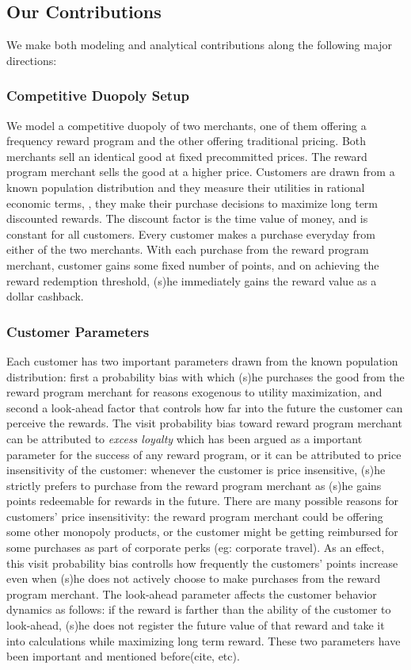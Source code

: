 \subsection{Our Contributions}
We make both modeling and analytical contributions along the following major directions:

\subsubsection{Competitive Duopoly Setup}
We model a competitive duopoly of two merchants, one of them offering a frequency reward program and the other offering traditional pricing.
Both merchants sell an identical good at fixed precommitted prices.
The reward program merchant sells the good at a higher price.
Customers are drawn from a known population distribution and they measure their utilities in rational economic terms, \ie, they make their purchase decisions to maximize long term discounted rewards.
The discount factor is the time value of money, and is constant for all customers.
Every customer makes a purchase everyday from either of the two merchants.
With each purchase from the reward program merchant, customer gains some fixed number of points, and on achieving the reward redemption threshold, (s)he immediately gains the reward value as a dollar cashback.

\subsubsection{Customer Parameters}
Each customer has two important parameters drawn from the known population distribution: first a probability bias with which (s)he purchases the good from the reward program merchant for reasons exogenous to utility maximization, and second a look-ahead factor that controls how far into the future the customer can perceive the rewards.
The visit probability bias toward reward program merchant can be attributed to \emph{excess loyalty} which has been argued as a important parameter for the success of any reward program, or it can be attributed to price insensitivity of the customer: whenever the customer is price insensitive, (s)he strictly prefers to purchase from the reward program merchant as (s)he gains points redeemable for rewards in the future.
There are many possible reasons for customers' price insensitivity: the reward program merchant could be offering some other monopoly products, or the customer might be getting reimbursed for some purchases as part of corporate perks (eg: corporate travel).
As an effect, this visit probability bias controlls how frequently the customers' points increase even when (s)he does not actively choose to make purchases from the reward program merchant.
The look-ahead parameter affects the customer behavior dynamics as follows: if the reward is farther than the ability of the customer to look-ahead, (s)he does not register the future value of that reward and take it into calculations while maximizing long term reward.
These two parameters have been important and mentioned before(cite, etc).


